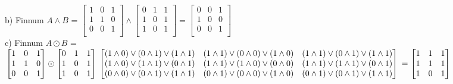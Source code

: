 b) Finnum $A \wedge B$ =
$\begin{bmatrix}
    1 & 0 & 1 \\
    1 & 1 & 0 \\
    0 & 0 & 1 \\
\end{bmatrix}\wedge 
\begin{bmatrix}
    0 & 1 & 1 \\
    1 & 0 & 1 \\
    1 & 0 & 1 \\
\end{bmatrix} = 
\begin{bmatrix}
    0 & 0 & 1 \\
    1 & 0 & 0 \\
    0 & 0 & 1 \\
\end{bmatrix}$\vspace*{1em} \\
c) Finnum $A \odot B$ =
$\begin{bmatrix}
    1 & 0 & 1 \\
    1 & 1 & 0 \\
    0 & 0 & 1 \\
\end{bmatrix}\odot
\begin{bmatrix} 
    0 & 1 & 1 \\
    1 & 0 & 1 \\
    1 & 0 & 1 \\
\end{bmatrix}\vspace*{0.5em} \\
\begin{bmatrix}
    (1\wedge0) \vee (0\wedge1) \vee (1\wedge1) & (1\wedge1) \vee (0\wedge0) \vee (1\wedge0) & (1\wedge1) \vee (0\wedge1) \vee (1\wedge1) \\
    (1\wedge0) \vee (1\wedge1) \vee (0\wedge1) & (1\wedge1) \vee (1\wedge0) \vee (0\wedge0) & (1\wedge1) \vee (1\wedge1) \vee (0\wedge1) \\
    (0\wedge0) \vee (0\wedge1) \vee (1\wedge1) & (0\wedge1) \vee (0\wedge0) \vee (1\wedge0) & (0\wedge1) \vee (0\wedge1) \vee (1\wedge1) \\
\end{bmatrix}\vspace*{0.5em} \\ = 
\begin{bmatrix} 
    1 & 1 & 1 \\
    1 & 1 & 1 \\
    1 & 0 & 1 \\
\end{bmatrix}$

